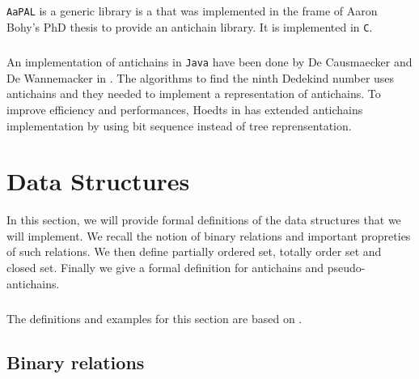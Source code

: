 \documentclass[letterpaper]{memoir}
\begin{document}

\paragraph{}

\texttt{AaPAL} is a generic
library is a that was implemented in the frame of
Aaron Bohy's PhD thesis \cite{bohy_phd}
to provide an antichain library. It is implemented in \texttt{C}.


\paragraph{}

An implementation of antichains in \texttt{Java} have been done
by De Causmaecker and De Wannemacker in \cite{causemaecker1}. The algorithms
to find the ninth Dedekind number uses antichains and they needed to
implement a representation of antichains.
To improve efficiency and performances, Hoedts in \cite{hoedt} has extended
\cite{causemaecker1} antichains implementation by using bit sequence
instead of tree reprensentation.



\chapter{Data Structures}

In this section, we will provide formal definitions of the data
structures that we will implement. We recall the notion of binary relations
and important propreties of such relations.
We then define partially ordered set, totally order set and closed set.
Finally we give a formal definition for antichains and pseudo-antichains.

\paragraph{}

The definitions and examples for this section are based on \cite{bohy_phd}.


\section{Binary relations}
\end{document}

